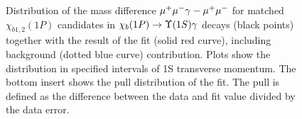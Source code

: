 \begin{figure}[H]
{\begin{picture}
  \end{picture}
  }
  \caption {\small 
    Distribution of the mass difference $\mumu \gamma - \mumu$ for matched
    $\chi_{b1,2}(1P)$ candidates in $\chibOneP \to \Y1S \gamma$ decays
    (black points) together with the result of the fit (solid red curve),
    including background (dotted blue curve) contribution. Plots show the
    distribution in specified intervals of \Y1S transverse momentum. The bottom
    insert shows the  pull distribution of the fit. The pull is defined as the
    difference  between the data and fit value divided by the data error. }
  \label{fig:mc:ups1s:fits1p}
\end{figure}


